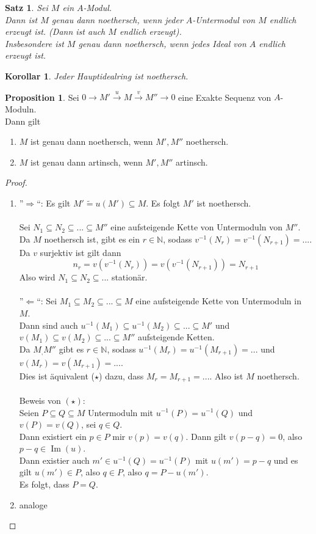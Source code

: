 \documentclass[10pt,a4paper]{article}
\newcommand{\N}{\ensuremath{\mathbb{N}}}
\newcommand{\isomorph}{\ensuremath{\tilde{=}}}
\newcommand{\Img}{\ensuremath{\operatorname{Im}}}
\newcounter{thm}[section]
\theoremstyle{definition}
\newtheorem{prop}[thm]{Proposition}
\theoremstyle{plain}
\newtheorem{kor}[thm]{Korollar}
\newtheorem{satz}[thm]{Satz}
\theoremstyle{remark}
\begin{document}
\begin{satz}
	Sei $M$ ein $A$-Modul.\\
	Dann ist $M$ genau dann noethersch, wenn jeder $A$-Untermodul von $M$ endlich erzeugt ist. (Dann ist auch $M$ endlich erzeugt).\\
	Insbesondere ist $M$ genau dann noethersch, wenn jedes Ideal von $A$ endlich erzeugt ist.
\end{satz}
\begin{kor}
	Jeder Hauptidealring ist noethersch.
\end{kor}
\begin{prop}
	\label{506Prop}
	Sei $0\rightarrow M'\xrightarrow{u}M\xrightarrow{v}M''\rightarrow 0$ eine Exakte Sequenz von $A$-Moduln.\\
	Dann gilt
	\begin{enumerate}
		\item $M$ ist genau dann noethersch, wenn $M',M''$ noethersch.
		\item $M$ ist genau dann artinsch, wenn $M',M''$ artinsch.
	\end{enumerate}
\end{prop}
\begin{proof}
	\begin{enumerate}
		\item ''$\Rightarrow$``:
			Es gilt $M'\isomorph u(M')\subseteq M$. Es folgt $M'$ ist noethersch.\\
			\\
			Sei $N_1\subseteq N_2\subseteq ...\subseteq M''$ eine aufsteigende Kette von Untermoduln von $M''$. Da $M$ noethersch ist, gibt es ein $r\in\N$, sodass $v^{-1}(N_r)=v^{-1}(N_{r+1})=...$.\\
			Da $v$ surjektiv ist gilt dann
			\[n_r=v(v^{-1}(N_r))=v(v^{-1}(N_{r+1}))=N_{r+1}\]
			Also wird $N_1\subseteq N_2\subseteq...$ stationär.\\
			\\
		''$\Leftarrow$``: 
			Sei $M_1\subseteq M_2\subseteq...\subseteq M$ eine aufsteigende Kette von Untermoduln in $M$.\\
			Dann sind auch $u^{-1}(M_1)\subseteq u^{-1}(M_2)\subseteq...\subseteq M'$ und $v(M_1)\subseteq v(M_2)\subseteq...\subseteq M''$ aufsteigende Ketten.\\
			Da $M_,M''$ gibt es $r\in\N$, sodass $u^{-1}(M_r)=u^{-1}(M_{r+1})=...$ und $v(M_r)=v(M_{r+1})=...$.\\
			Dies ist äquivalent ($\star$) dazu, dass $M_r=M_{r+1}=...$. Also ist $M$ noethersch.\\
			\\
		Beweis von $(\star)$:\\
		Seien $P\subseteq Q\subseteq M$ Untermoduln mit $u^{-1}(P)=u^{-1}(Q)$ und $v(P)=v(Q)$, sei $q\in Q$.\\
		Dann existiert ein $p\in P$ mir $v(p)=v(q)$. Dann gilt $v(p-q)=0$, also $p-q\in\Img(u)$.\\
		Dann existier auch $m'\in u^{-1}(Q)=u^{-1}(P)$ mit $u(m')=p-q$ und es gilt $u(m')\in P$, also $q\in P$, also $q=P-u(m')$.\\
		Es folgt, dass $P=Q$.
		\item analoge
	\end{enumerate}
\end{proof}
\end{document}
